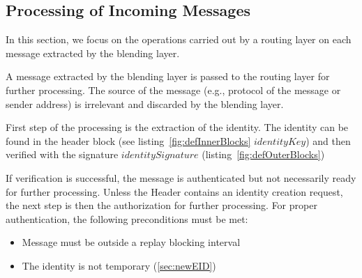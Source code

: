 

\subsection{Processing of Incoming Messages}\label{sec:processingIncommingMessages}
In this section, we focus on the operations carried out by a routing layer on each message extracted by the blending layer. 

A message extracted by the blending layer is passed to the routing layer for further processing. The source of the message (e.g., protocol of the message or sender address) is irrelevant and discarded by the blending layer. 

First step of the processing is the extraction of the identity. The identity can be found in the header block (see listing~\ref{fig:defInnerBlocks} $identityKey$) and then verified with the signature $identitySignature$ (listing~\ref{fig:defOuterBlocks})

\begin{lstfloat}[ht]
	
	\caption{Definition of the inner message blocks.}
	\label{fig:defInnerBlocks}
\end{lstfloat}

If verification is successful, the message is authenticated but not necessarily ready for further processing. Unless the Header contains an identity creation request, the next step is then the authorization for further processing. For proper authentication, the following preconditions must be met:
\begin{itemize}
	\item Message must be outside a replay blocking interval
	\item The identity is not temporary (\cref{sec:newEID})
\end{itemize}

